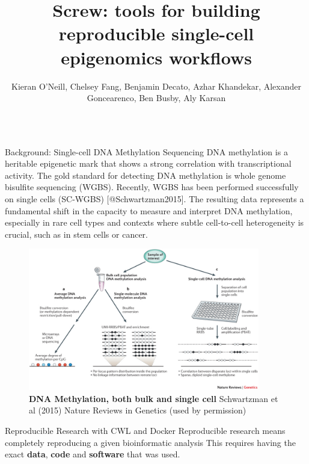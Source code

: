 \documentclass{beamer}
\title{Screw: tools for building reproducible single-cell epigenomics workflows}
\author{Kieran O'Neill, Chelsey Fang, Benjamin Decato, Azhar Khandekar, Alexander Goncearenco, Ben Busby, Aly Karsan}
\institute{Genome Sciences Centre, BC Cancer Agency, Vancouver, BC, Canada}
\begin{document}
\begin{frame}
\begin{columns}[t]



\begin{column}{.32\textwidth}


\begin{block}{Background: Single-cell DNA Methylation Sequencing}
DNA methylation is a heritable epigenetic mark that shows a strong correlation with transcriptional activity. 
The gold standard for detecting DNA methylation is whole genome bisulfite sequencing (WGBS). 
Recently, WGBS has been performed successfully on single cells (SC-WGBS) [@Schwartzman2015].
The resulting data represents a fundamental shift in the capacity to measure and interpret DNA methylation, especially in rare cell types and contexts where subtle cell-to-cell heterogeneity is crucial, such as in stem cells or cancer. 

\begin{figure}
\begin{center}
\includegraphics[width=0.9\textwidth]{figures/nrg3980-f1.jpg}
\end{center}
\caption[]{\textbf{DNA Methylation, both bulk and single cell}
\small{Schwartzman et al (2015) Nature Reviews in Genetics (used by permission) } }
\end{figure}

\end{block}


\begin{block}{Reproducible Research with CWL and Docker}
Reproducible research means completely reproducing a given bioinformatic analysis
This requires having the exact \textbf{data}, \textbf{code} and \textbf{software} that was used.


\end{block}
\end{column}
\end{columns}
\end{frame}
\end{document}
